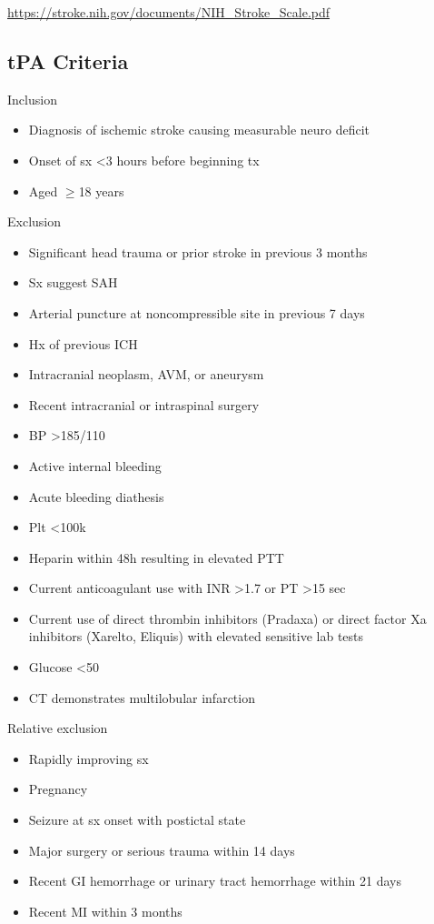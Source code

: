 \documentclass[8pt]{extarticle}
\begin{document}
\url{https://stroke.nih.gov/documents/NIH_Stroke_Scale.pdf}
\newpage

\subsection{tPA Criteria}
Inclusion
\begin{itemize}
    \item Diagnosis of ischemic stroke causing measurable neuro deficit
    \item Onset of sx <3 hours before beginning tx
    \item Aged $\geq$18 years
\end{itemize}
Exclusion
\begin{itemize}
    \item Significant head trauma or prior stroke in previous 3 months
    \item Sx suggest SAH
    \item Arterial puncture at noncompressible site in previous 7 days
    \item Hx of previous ICH
    \item Intracranial neoplasm, AVM, or aneurysm
    \item Recent intracranial or intraspinal surgery
    \item BP >185/110
    \item Active internal bleeding
    \item Acute bleeding diathesis
    \item Plt <100k
    \item Heparin within 48h resulting in elevated PTT
    \item Current anticoagulant use with INR >1.7 or PT >15 sec
    \item Current use of direct thrombin inhibitors (Pradaxa) or direct factor Xa inhibitors (Xarelto, Eliquis) with elevated sensitive lab tests
    \item Glucose <50
    \item CT demonstrates multilobular infarction
\end{itemize}
Relative exclusion
\begin{itemize}
    \item Rapidly improving sx
    \item Pregnancy
    \item Seizure at sx onset with postictal state
    \item Major surgery or serious trauma within 14 days
    \item Recent GI hemorrhage or urinary tract hemorrhage within 21 days
    \item Recent MI within 3 months
\end{itemize}
\end{document}
